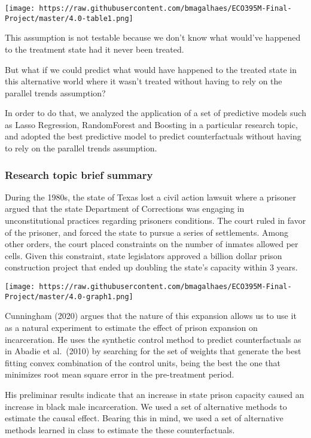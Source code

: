 \documentclass[
]{article}
\begin{document}
\texttt{[image: https://raw.githubusercontent.com/bmagalhaes/ECO395M-Final-Project/master/4.0-table1.png]}

This assumption is not testable because we don't know what would've
happened to the treatment state had it never been treated.

But what if we could predict what would have happened to the treated
state in this alternative world where it wasn't treated without having
to rely on the parallel trends assumption?

In order to do that, we analyzed the application of a set of predictive
models such as Lasso Regression, RandomForest and Boosting in a
particular research topic, and adopted the best predictive model to
predict counterfactuals without having to rely on the parallel trends
assumption.

\hypertarget{research-topic-brief-summary}{%
\subsubsection{Research topic brief
summary}\label{research-topic-brief-summary}}

During the 1980s, the state of Texas lost a civil action lawsuit where a
prisoner argued that the state Department of Corrections was engaging in
unconstitutional practices regarding prisoners conditions. The court
ruled in favor of the prisoner, and forced the state to pursue a series
of settlements. Among other orders, the court placed constraints on the
number of inmates allowed per cells. Given this constraint, state
legislators approved a billion dollar prison construction project that
ended up doubling the state's capacity within 3 years.

\texttt{[image: https://raw.githubusercontent.com/bmagalhaes/ECO395M-Final-Project/master/4.0-graph1.png]}

Cunningham (2020) argues that the nature of this expansion allows us to
use it as a natural experiment to estimate the effect of prison
expansion on incarceration. He uses the synthetic control method to
predict counterfactuals as in Abadie et al.~(2010) by searching for the
set of weights that generate the best fitting convex combination of the
control units, being the best the one that minimizes root mean square
error in the pre-treatment period.

His preliminar results indicate that an increase in state prison
capacity caused an increase in black male incarceration. We used a set
of alternative methods to estimate the causal effect. Bearing this in
mind, we used a set of alternative methods learned in class to estimate
the these counterfactuals.
\end{document}
